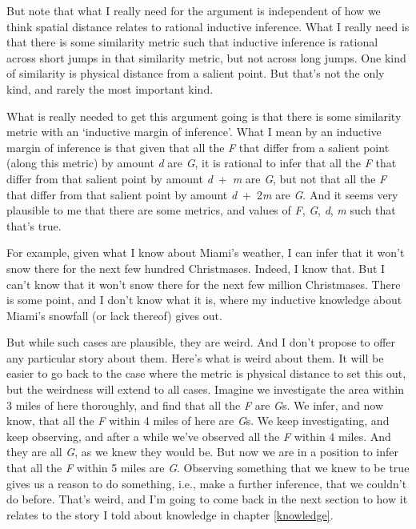 \documentclass[
  11pt,
]{book}
\begin{document}
But note that what I really need for the argument is independent of how we think spatial distance relates to rational inductive inference. What I really need is that there is some similarity metric such that inductive inference is rational across short jumps in that similarity metric, but not across long jumps. One kind of similarity is physical distance from a salient point. But that's not the only kind, and rarely the most important kind.

What is really needed to get this argument going is that there is some similarity metric with an `inductive margin of inference'. What I mean by an inductive margin of inference is that given that all the \emph{F} that differ from a salient point (along this metric) by amount \emph{d} are \emph{G}, it is rational to infer that all the \emph{F} that differ from that salient point by amount \emph{d}~+~\emph{m} are \emph{G}, but not that all the \emph{F} that differ from that salient point by amount \emph{d}~+~2\emph{m} are \emph{G}. And it seems very plausible to me that there are some metrics, and values of \emph{F}, \emph{G}, \emph{d}, \emph{m} such that that's true.

For example, given what I know about Miami's weather, I can infer that it won't snow there for the next few hundred Christmases. Indeed, I know that. But I can't know that it won't snow there for the next few million Christmases. There is some point, and I don't know what it is, where my inductive knowledge about Miami's snowfall (or lack thereof) gives out.

But while such cases are plausible, they are weird. And I don't propose to offer any particular story about them. Here's what is weird about them. It will be easier to go back to the case where the metric is physical distance to set this out, but the weirdness will extend to all cases. Imagine we investigate the area within 3 miles of here thoroughly, and find that all the \emph{F} are \emph{G}s. We infer, and now know, that all the \emph{F} within 4 miles of here are \emph{G}s. We keep investigating, and keep observing, and after a while we've observed all the \emph{F} within 4 miles. And they are all \emph{G}, as we knew they would be. But now we are in a position to infer that all the \emph{F} within 5 miles are \emph{G}. Observing something that we knew to be true gives us a reason to do something, i.e., make a further inference, that we couldn't do before. That's weird, and I'm going to come back in the next section to how it relates to the story I told about knowledge in chapter \ref{knowledge}.
\end{document}
